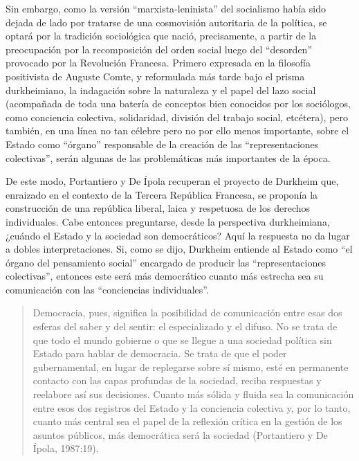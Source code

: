 Sin embargo, como la versión ``marxista-leninista'' del socialismo había sido dejada de lado por tratarse de una cosmovisión autoritaria de la política, se optará por la tradición sociológica que nació, precisamente, a partir de la preocupación por la recomposición del orden social luego del ``desorden'' provocado por la Revolución Francesa. Primero expresada en la filosofía positivista de Auguste Comte, y reformulada más tarde bajo el prisma durkheimiano, la indagación sobre la naturaleza y el papel del lazo social (acompañada de toda una batería de conceptos bien conocidos por los sociólogos, como conciencia colectiva, solidaridad, división del trabajo social, etcétera), pero también, en una línea no tan célebre pero no por ello menos importante, sobre el Estado como ``órgano'' responsable de la creación de las ``representaciones colectivas'', serán algunas de las problemáticas más importantes de la época.

De este modo, Portantiero y De Ípola recuperan el proyecto de Durkheim que, enraizado en el contexto de la Tercera República Francesa, se proponía la construcción de una república liberal, laica y respetuosa de los derechos individuales. Cabe entonces preguntarse, desde la perspectiva durkheimiana, ¿cuándo el Estado y la sociedad son democráticos? Aquí la respuesta no da lugar a dobles interpretaciones. Si, como se dijo, Durkheim entiende al Estado como ``el órgano del pensamiento social'' encargado de producir las ``representaciones colectivas'', entonces este será más democrático cuanto más estrecha sea su comunicación con las ``conciencias individuales''.

\begin{quote}
Democracia, pues, significa la posibilidad de comunicación entre esas dos esferas del saber y del sentir: el especializado y el difuso. No se trata de que todo el mundo gobierne o que se llegue a una sociedad política sin Estado para hablar de democracia. Se trata de que el poder gubernamental, en lugar de replegarse sobre sí mismo, esté en permanente contacto con las capas profundas de la sociedad, reciba respuestas y reelabore así sus decisiones. Cuanto más sólida y fluida sea la comunicación entre esos dos registros del Estado y la conciencia colectiva y, por lo tanto, cuanto más central sea el papel de la reflexión crítica en la gestión de los asuntos públicos, más democrática será la sociedad (Portantiero y De Ípola, 1987:19).
\end{quote}

